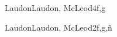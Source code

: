 \begin{syllabus}
\begin{unit}{\SPSocialContext}{}{LaudonLaudon, McLeod}{4}{f,g}
    \begin{topics}
	    \item \SPSocialContextTopicSocial
	    \item \SPSocialContextTopicImpact
	    \item \SPSocialContextTopicGrowth
	    \item \SPSocialContextTopicOften
	    \item \SPSocialContextTopicAccessibility
	    \item \SPSocialContextTopicContext
    \end{topics}
    \begin{learningoutcomes}%
	    \item \SPSocialContextLODescribePositive[\Familiarity]
	    \item \SPSocialContextLOIdentifyDevelopers[\Usage]
	    \item \SPSocialContextLOInterpretThe[\Assessment]
	    \item \SPSocialContextLOEvaluateTheA [\Familiarity]
	    \item \SPSocialContextLOSummarizeTheSocial [\Familiarity]
	    \item \SPSocialContextLODiscussHowServes [\Familiarity]
	    \item \SPSocialContextLOAnalyzeTheCons [\Familiarity]
	    \item \SPSocialContextLODescribeTheTheOf [\Usage]
	    \item \SPSocialContextLOExplainTheContext [\Familiarity]
    \end{learningoutcomes}
\end{unit}

\begin{unit}{\SPAnalyticalTools}{}{LaudonLaudon, McLeod}{2}{f,g,ñ}
      \begin{topics}
      \item \SPAnalyticalToolsTopicEthical
      \item \SPAnalyticalToolsTopicEthicalTheories
      \item \SPAnalyticalToolsTopicMoral
      \end{topics}
      
      \begin{learningoutcomes}%
      \item \SPAnalyticalToolsLOEvaluateStakeholder [\Familiarity]
      \item \SPAnalyticalToolsLOAnalyzeBasic [\Usage]
      \item \SPAnalyticalToolsLOAnalyzeAn [\Familiarity]
      \item \SPAnalyticalToolsLOIllustrateThe [\Familiarity]
      \item \SPAnalyticalToolsLOEvaluateEthical [\Familiarity]
      \end{learningoutcomes}
\end{unit}


\end{syllabus}
